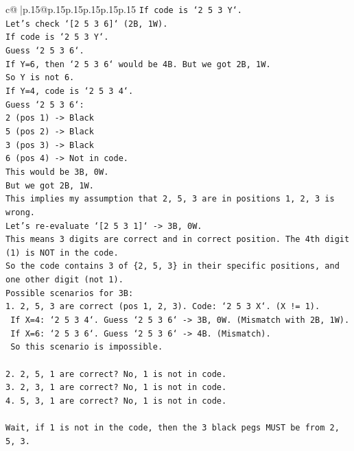 \documentclass{article}
\begin{document}
{\begin{supertabular}{c@{$\;$}|p{.15\linewidth}@{}p{.15\linewidth}p{.15\linewidth}p{.15\linewidth}p{.15\linewidth}p{.15\linewidth}}
{{{\texttt{If code is `2 5 3 Y`.} \\
\texttt{Let's check `{[}2 5 3 6{]}` (2B, 1W).} \\
\texttt{If code is `2 5 3 Y`.} \\
\texttt{Guess `2 5 3 6`.} \\
\texttt{If Y=6, then `2 5 3 6` would be 4B. But we got 2B, 1W.} \\
\texttt{So Y is not 6.} \\
\texttt{If Y=4, code is `2 5 3 4`.} \\
\texttt{Guess `2 5 3 6`:} \\
\texttt{2 (pos 1) {-}> Black} \\
\texttt{5 (pos 2) {-}> Black} \\
\texttt{3 (pos 3) {-}> Black} \\
\texttt{6 (pos 4) {-}> Not in code.} \\
\texttt{This would be 3B, 0W.} \\
\texttt{But we got 2B, 1W.} \\
\texttt{This implies my assumption that 2, 5, 3 are in positions 1, 2, 3 is wrong.} \\
\texttt{Let's re{-}evaluate `{[}2 5 3 1{]}` {-}> 3B, 0W.} \\
\texttt{This means 3 digits are correct and in correct position. The 4th digit (1) is NOT in the code.} \\
\texttt{So the code contains 3 of \{2, 5, 3\} in their specific positions, and one other digit (not 1).} \\
\texttt{Possible scenarios for 3B:} \\
\texttt{1. 2, 5, 3 are correct (pos 1, 2, 3). Code: `2 5 3 X`. (X != 1).} \\
\texttt{   If X=4: `2 5 3 4`. Guess `2 5 3 6` {-}> 3B, 0W. (Mismatch with 2B, 1W).} \\
\texttt{   If X=6: `2 5 3 6`. Guess `2 5 3 6` {-}> 4B. (Mismatch).} \\
\texttt{   So this scenario is impossible.} \\
\\ 
\texttt{2. 2, 5, 1 are correct? No, 1 is not in code.} \\
\texttt{3. 2, 3, 1 are correct? No, 1 is not in code.} \\
\texttt{4. 5, 3, 1 are correct? No, 1 is not in code.} \\
\\ 
\texttt{Wait, if 1 is not in the code, then the 3 black pegs MUST be from 2, 5, 3.} \\
}}}
\end{supertabular}}
\end{document}
